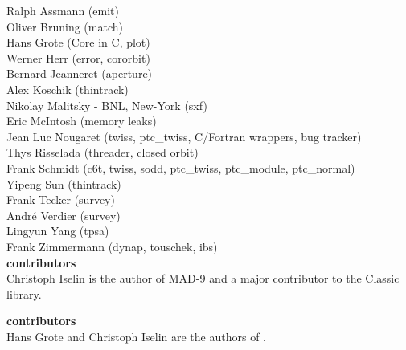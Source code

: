 Ralph Assmann  (emit) \\
Oliver Bruning (match) \\
Hans Grote (Core in C, plot) \\
Werner Herr (error, cororbit) \\
Bernard Jeanneret (aperture) \\
Alex Koschik (thintrack) \\
Nikolay Malitsky - BNL, New-York  (sxf) \\
Eric McIntosh (memory leaks) \\
Jean Luc Nougaret (twiss, ptc\_twiss, C/Fortran wrappers, bug tracker) \\
Thys Risselada (threader, closed orbit) \\
Frank Schmidt (c6t, twiss, sodd, ptc\_twiss, ptc\_module, ptc\_normal) \\
Yipeng Sun (thintrack) \\
Frank Tecker (survey) \\
Andr\'e Verdier (survey) \\
Lingyun Yang (tpsa) \\
Frank Zimmermann (dynap, touschek, ibs) \\

\textbf{\madnine contributors}\\
Christoph Iselin is the author of MAD-9 and a major contributor to the Classic library.

\textbf{\madeight contributors}\\
Hans Grote and Christoph Iselin are the authors of \madeight.

\newpage

